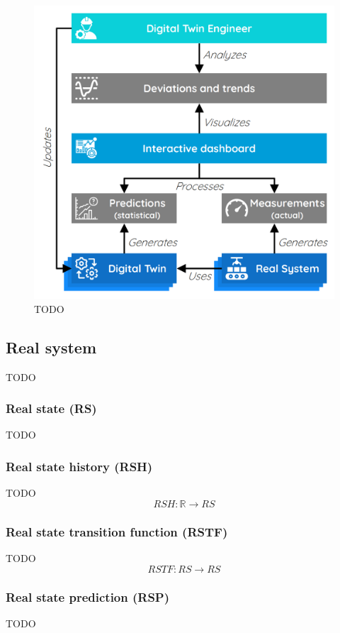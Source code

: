 \documentclass[9pt,conference]{IEEEtran}
\begin{document}
    \begin{figure}[htbp]
        \includegraphics[width=\columnwidth]{Continuous Quality Control.png}
        \caption{TODO}
        \label{todo}
    \end{figure}

    \subsection{Real system}
    TODO

    \subsubsection{Real state (RS)}
    TODO

    \subsubsection{Real state history (RSH)}
    TODO
    \[
        RSH: \mathbb{R} \rightarrow RS
    \]

    \subsubsection{Real state transition function (RSTF)}
    TODO
    \[
        RSTF: RS \rightarrow RS
    \]

    \subsubsection{Real state prediction (RSP)}
    TODO
    
\end{document}

